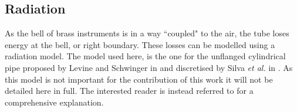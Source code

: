 

\subsection{Radiation}
As the bell of brass instruments is in a way ``coupled" to the air, the tube loses energy at the bell, or right boundary. These losses can be modelled using a radiation model. The model used here, is the one for the unflanged cylindrical pipe proposed by Levine and Schwinger in \cite{Levine1948} and discretised by Silva \emph{et al.} in \cite{Silva2009}. As this model is not important for the contribution of this work it will not be detailed here in full. The interested reader is instead referred to \cite{Bilbao2013, Harrison2018} for a comprehensive explanation. %
